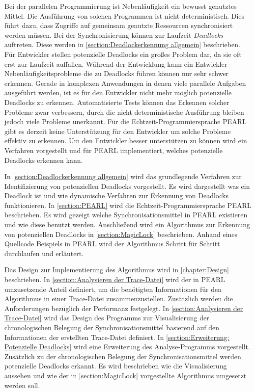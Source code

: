Bei der parallelen Programmierung ist Nebenläufigkeit ein bewusst genutztes Mittel. Die Ausführung von solchen Programmen ist nicht deterministisch. Dies führt dazu, dass Zugriffe auf gemeinsam genutzte Ressourcen synchronisiert werden müssen. Bei der Synchronisierung können zur Laufzeit \textit{Deadlocks} auftreten. Diese werden in \cref{section:Deadlockerkennung allgemein} beschrieben. Für Entwickler stellen potenzielle Deadlocks ein großes Problem dar, da sie oft erst zur Laufzeit auffallen. Während der Entwicklung kann ein Entwickler Nebenläufigkeitsprobleme die zu Deadlocks führen können nur sehr schwer erkennen. Gerade in komplexen Anwendungen in denen viele parallele Aufgaben ausgeführt werden, ist es für den Entwickler nicht mehr möglich potenzielle Deadlocks zu erkennen. Automatisierte Tests können das Erkennen solcher Probleme zwar verbessern, durch die nicht deterministische Ausführung bleiben jedoch viele Probleme unerkannt. Für die Echtzeit-Programmiersprache PEARL gibt es derzeit keine Unterstützung für den Entwickler um solche Probleme effektiv zu erkennen. Um den Entwickler besser unterstützen zu können wird ein Verfahren vorgestellt und für PEARL implementiert, welches potenzielle Deadlocks erkennen kann.

In \cref{section:Deadlockerkennung allgemein} wird das grundlegende Verfahren zur Identifizierung von potenziellen Deadlocks vorgestellt. Es wird dargestellt was ein Deadlock ist und wie dynamische Verfahren zur Erkennung von Deadlocks funktionieren. In \cref{section:PEARL} wird die Echtzeit-Programmiersprache PEARL \autocite{PEARL} beschrieben. Es wird gezeigt welche Synchronisationsmittel in PEARL existieren und wie diese benutzt werden. Anschließend wird ein Algorithmus zur Erkennung von potenziellen Deadlocks in \cref{section:MagicLock} beschrieben. Anhand eines Quellcode Beispiels in PEARL wird der Algorithmus Schritt für Schritt durchlaufen und erläutert. 

Das Design zur Implementierung des Algorithmus wird in \cref{chapter:Design} beschrieben. In \cref{section:Analysieren der Trace-Datei} wird der in PEARL umzusetzende Anteil definiert, um die benötigten Informationen für den Algorithmus in einer Trace-Datei zusammenzustellen. Zusätzlich werden die Anforderungen bezüglich der Performanz festgelegt. In \cref{section:Analysieren der Trace-Datei} wird das Design des Programms zur Visualisierung der chronologischen Belegung der Synchronisationsmittel basierend auf den Informationen der erstellten Trace-Datei definiert. In \cref{section:Erweiterung: Potenzielle Deadlocks} wird eine Erweiterung des Analyse-Programms vorgestellt. Zusätzlich zu der chronologischen Belegung der Synchronisationsmittel werden potenzielle Deadlocks erkannt. Es wird beschrieben wie die Visualisierung aussehen und wie der in \cref{section:MagicLock} vorgestellte Algorithmus umgesetzt werden soll.

